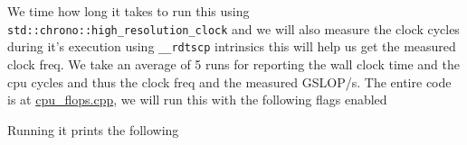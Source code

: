 \begin{Shaded}
\begin{Highlighting}[]
\OperatorTok{=}\OperatorTok{();}
    \OperatorTok{(}\OperatorTok{=}\OperatorTok{;}\OperatorTok{\textless{}}\OperatorTok{;}\OperatorTok{++)} \OperatorTok{\{}
\OperatorTok{=}\OperatorTok{(}\OperatorTok{,}\OperatorTok{[}\OperatorTok{]);}
    \OperatorTok{\}}
\OperatorTok{[}\OperatorTok{]} \OperatorTok{+=}\OperatorTok{[}\OperatorTok{];}
\OperatorTok{\}}
\end{Highlighting}
\end{Shaded}

We time how long it takes to run this using
\texttt{std::chrono::high\_resolution\_clock} and we will also measure
the clock cycles during it's execution using \texttt{\_\_rdtscp}
intrinsics this will help us get the measured clock freq. We take an
average of 5 runs for reporting the wall clock time and the cpu cycles
and thus the clock freq and the measured GSLOP/s. The entire code is at
\href{./cpu_flops.cpp}{cpu\_flops.cpp}, we will run this with the
following flags enabled

\begin{Shaded}
\begin{Highlighting}[]
 \OperatorTok{=}

    \OperatorTok{=}

\end{Highlighting}
\end{Shaded}

Running it prints the following


